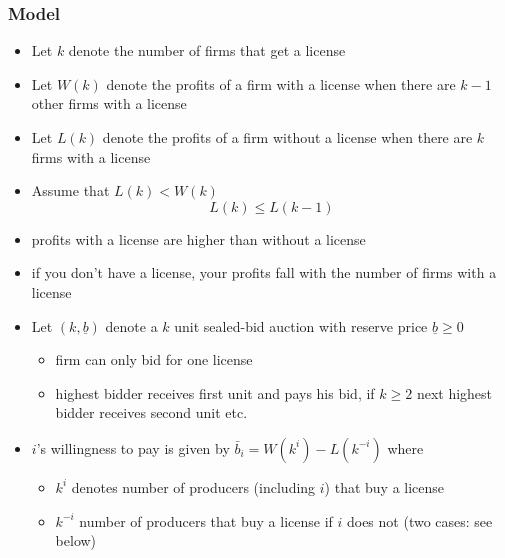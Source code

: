 \documentclass[11pt,english]{beamer}
\begin{document}
\begin{frame}[allowframebreaks]\frametitle{Model}
\label{sec-2-2}
\begin{itemize}

\item Let $k$ denote the number of firms that get a license\\
\label{sec-2-2-1}%
\item Let $W(k)$ denote the profits of a firm with a license when there are $k-1$ other firms with a license\\
\label{sec-2-2-2}%
\item Let $L(k)$ denote the profits of a firm without a license when there are $k$ firms with a license\\
\label{sec-2-2-3}%
\item Assume that $L(k) < W(k)$
\label{sec-2-2-4}%
\begin{equation}
\label{eq:AssLandW}
L(k) \leq L(k-1)
\end{equation}

\item profits with a license are higher than without a license\\
\label{sec-2-2-5}%
\item if you don't have a license, your profits fall with the number of firms with a license\\
\label{sec-2-2-6}%
\item Let $(k,\underline b)$ denote a $k$ unit sealed-bid auction with reserve price $\underline b \geq 0$
\label{sec-2-2-7}%
\begin{itemize}

\item firm can only bid for one license\\
\label{sec-2-2-7-1}%
\item highest bidder receives first unit and pays his bid, if $k \geq 2$ next highest bidder receives second unit etc.\\
\label{sec-2-2-7-2}%
\end{itemize} %

\item $i$'s willingness to pay is given by $\bar b_{i} = W(k^{i})-L(k^{-i})$ where
\label{sec-2-2-8}%
\begin{itemize}

\item $k^{i}$ denotes number of producers (including $i$) that buy a license\\
\label{sec-2-2-8-1}%
\item $k^{-i}$ number of producers that buy a license if $i$ does not (two cases: see below)\\
\label{sec-2-2-8-2}%
\end{itemize} %


\end{itemize}
\end{frame}
\end{document}
